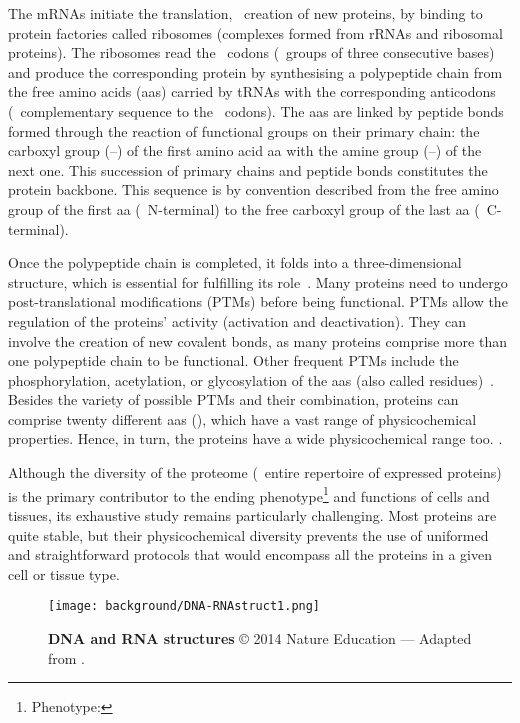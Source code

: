 The \glspl{mRNA} initiate the translation,
\ie\ creation of new proteins,
by binding to protein factories called ribosomes
(complexes formed from \glspl{rRNA} and ribosomal proteins).
The ribosomes read the \mRNA\ codons (\ie\ groups of three consecutive bases)
and produce the corresponding protein by synthesising a polypeptide chain
from the free amino acids (\glspl{aa}) carried by \glspl{tRNA}
with the corresponding anticodons (\ie\ complementary sequence to the \mRNA\ codons).
The \glspl{aa} are linked by peptide bonds formed
through the reaction of functional groups on their primary chain:
the carboxyl group (--) of the first amino acid \gls{aa}
with the amine group (--) of the next one.
This succession of primary chains and peptide bonds constitutes
the protein backbone.
This sequence is by convention described
from the free amino group of the first \gls{aa} (\ie\ N-terminal)
to the free carboxyl group of the last \gls{aa} (\ie\ C-terminal).\mybr\

Once the polypeptide chain is completed,
it folds into a three-dimensional structure,
which is essential for fulfilling its role~.
Many proteins need to undergo post-translational modifications (\glspl{PTM})
before being functional.
\glspl{PTM} allow the regulation of the proteins' activity
(activation and deactivation).
They can involve the creation of new covalent bonds,
as many proteins comprise more than one polypeptide chain to be functional.
Other frequent \glspl{PTM} include the phosphorylation, acetylation,
or glycosylation of the \glspl{aa} (also called residues)~.
Besides the variety of possible \glspl{PTM} and their combination,
proteins can comprise twenty different \glspl{aa} (),
which have a vast range of physicochemical properties.
Hence, in turn, the proteins have a wide physicochemical range too.
.\mybr\

Although the diversity of the proteome
(\ie\ entire repertoire of expressed proteins)
is the primary contributor to
the ending \gls{phenotype}\footnote{Phenotype: }
and functions of cells and tissues,
its exhaustive study remains particularly challenging.
Most proteins are quite stable,
but their physicochemical diversity prevents
the use of uniformed and straightforward protocols
that would encompass all the proteins
in a given cell or tissue type.~\mybr\

\begin{figure}[!htbp]
    \texttt{[image: background/DNA-RNAstruct1.png]}\centering
    \vspace{-2mm}
    \caption[DNA and RNA structures]{\label{fig:DNARNAstruct}%
    \textbf{DNA and RNA structures} © 2014 Nature Education ---
    Adapted from \citet{Pierce2005-ib}.}
\end{figure}

